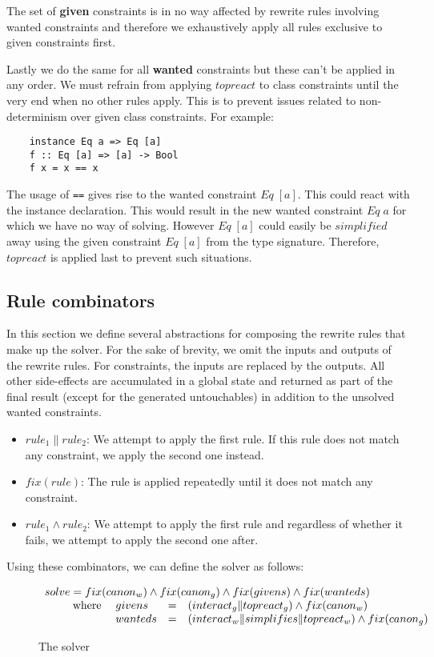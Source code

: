 The set of \textbf{given} constraints is in no way affected by rewrite rules
involving wanted constraints and therefore we exhaustively apply all rules
exclusive to given constraints first.

Lastly we do the same for all \textbf{wanted} constraints but these can't be
applied in any order. We must refrain from applying $topreact$ to class
constraints until the very end when no other rules apply. This is to prevent
issues related to non-determinism over given class constraints. For example:
\begin{verbatim}
    instance Eq a => Eq [a]
    f :: Eq [a] => [a] -> Bool
    f x = x == x
\end{verbatim}
The usage of \texttt{==} gives rise to the wanted constraint $Eq \; [a]$. This
could react with the instance declaration. This would result in the new wanted
constraint $Eq \; a$ for which we have no way of solving. However $Eq \; [a]$ could
easily be $simplified$ away using the given constraint $Eq \; [a]$ from the type
signature. Therefore, $topreact$ is applied last to prevent such situations.

\newpage
\subsection{Rule combinators}
In this section we define several abstractions for composing the rewrite rules
that make up the solver. For the sake of brevity, we omit the inputs and outputs
of the rewrite rules. For constraints, the inputs are replaced by the outputs.
All other side-effects are accumulated in a global state and returned as part of
the final result (except for the generated untouchables) in addition to the
unsolved wanted constraints.

\begin{itemize}
  \item $rule_1 \| rule_2$: We attempt to apply the first rule. If this rule
  does not match any constraint, we apply the second one instead.
  \item $fix(rule)$: The rule is applied repeatedly until it does not match any
  constraint.
  \item $rule_1 \wedge rule_2$: We attempt to apply the first rule and
  regardless of whether it fails, we attempt to apply the second one after.
\end{itemize}

Using these combinators, we can define the solver as follows:
\begin{figure}
\[
\begin{array}{l}
  solve = fix(canon_w) \wedge fix(canon_g) \wedge fix(givens) \wedge
  fix(wanteds)
  \\ 
  \begin{array}{l l c l}
    \qquad \text{where} \; &givens &=& (interact_g \| topreact_g) \wedge fix(canon_w)
    \\
    &wanteds &=& (interact_w \| simplifies \| topreact_w) \wedge fix(canon_g)
  \end{array}
\end{array}
\]
\caption{The solver}
\end{figure}

